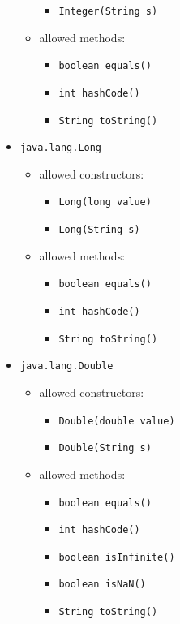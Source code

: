 \documentclass[a4paper]{report}
\begin{document}
\begin{itemize}
\begin{itemize}
\begin{itemize}
				\item \texttt{Integer(String s)}
			\end{itemize}
	\item allowed methods:
			\begin{itemize}
				\item \texttt{boolean equals()}
				\item \texttt{int hashCode()}
				\item \texttt{String toString()}
			\end{itemize}
	\end{itemize}
\item \texttt{java.lang.Long}
	\begin{itemize}
	\item allowed constructors:
			\begin{itemize}
				\item \texttt{Long(long value)}
				\item \texttt{Long(String s)}
			\end{itemize}
	\item allowed methods:
			\begin{itemize}
				\item \texttt{boolean equals()}
				\item \texttt{int hashCode()}
				\item \texttt{String toString()}
			\end{itemize}
	\end{itemize}
\item \texttt{java.lang.Double}
	\begin{itemize}
	\item allowed constructors:
			\begin{itemize}
				\item \texttt{Double(double value)}
				\item \texttt{Double(String s)}
			\end{itemize}
	\item allowed methods:
			\begin{itemize}
				\item \texttt{boolean equals()}
				\item \texttt{int hashCode()}
				\item \texttt{boolean isInfinite()}
				\item \texttt{boolean isNaN()}
				\item \texttt{String toString()}
			\end{itemize}
	\end{itemize}

\end{itemize}
\end{document}
